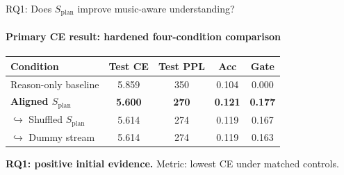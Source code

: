 \documentclass[aspectratio=169,11pt]{beamer}
\newcommand{\splan}{$S_{\mathrm{plan}}$}
\newcommand{\hook}{$\hookrightarrow$}
\begin{document}
\begin{frame}{RQ1: Does \splan{} improve music-aware understanding?}
  \framesubtitle{Primary CE result: hardened four-condition comparison}

  {\small
  \begin{tabular}{p{4.0cm}cccc}
    \toprule
    \textbf{Condition} & \textbf{Test CE} & \textbf{Test PPL} & \textbf{Acc} & \textbf{Gate} \\
    \midrule
    Reason-only baseline    & 5.859 & 350 & 0.104 & 0.000 \\
    \rowcolor{HLrow}
    \textbf{Aligned \splan{}} & \textbf{5.600} & \textbf{270} & \textbf{0.121} & \textbf{0.177} \\
    \hook{} Shuffled \splan{} & 5.614 & 274 & 0.119 & 0.167 \\
    \hook{} Dummy stream      & 5.614 & 274 & 0.119 & 0.163 \\
    \bottomrule
  \end{tabular}}

  \smallskip
  \begin{tcolorbox}[good]
    \textbf{RQ1: positive initial evidence.} Metric: lowest CE under matched controls.
  \end{tcolorbox}
\end{frame}
\end{document}
